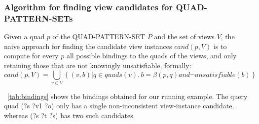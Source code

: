 \documentclass[a4paper,twoside,bibtotoc,abstracton,12pt,BCOR=15mm]{scrreprt}
\begin{document}
\subsubsection{Algorithm for finding view candidates for QUAD-PATTERN-SETs}
\label{alg:canditate-finding}

Given a quad $p$ of the QUAD-PATTERN-SET $P$ and the set of views $V$, the naive approach for finding the candidate view instances $cand(p, V)$ is 
to compute for every $p$ all possible bindings to the quads of the views, and only retaining those that are not knowingly unsatisfiable, formally:
\begin{equation}\label{eq:candidate-set}
cand(p, V) = \bigcup_{v \in V} \left \{ (v, b) | q \in quads(v), b = \beta(p, q) and \lnot unsatisfiable(b) \right \}
\end{equation} 

~\autoref{tab:bindings} shows the bindings obtained for our running example. The query quad (?s ?v1 ?o) only has a single
non-inconsistent view-instance candidate, whereas (?s ?t ?s) has two such candidates.
\end{document}
